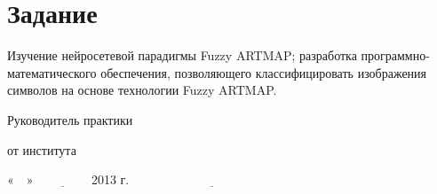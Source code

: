 \newpage
\section{Задание}

Изучение нейросетевой парадигмы Fuzzy ARTMAP; разработка программно-математического обеспечения, позволяющего классифицировать изображения символов на основе технологии Fuzzy ARTMAP.



\vspace{5em}

Руководитель практики

от института

«$\quad$» $\underline{\qquad \qquad}$ 2013 г.	$\qquad \qquad$			$\underline{\qquad \qquad}$